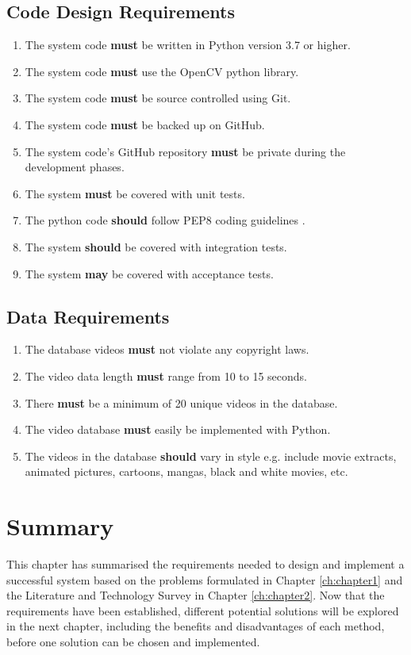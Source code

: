 \subsection{Code Design Requirements}

\begin{enumerate}
    \item The system code \textbf{must} be written in Python version 3.7 or higher.
    \item The system code \textbf{must} use the OpenCV python library.
    \item The system code \textbf{must} be source controlled using Git.
    \item The system code \textbf{must} be backed up on GitHub.
    \item The system code's GitHub repository \textbf{must} be private during the development phases.
    \item The system \textbf{must} be covered with unit tests.
    \item The python code \textbf{should} follow PEP8 coding guidelines \cite{pep8}.
    \item The system \textbf{should} be covered with integration tests.
    \item The system \textbf{may} be covered with acceptance tests.
\end{enumerate}

\subsection{Data Requirements}

\begin{enumerate}
    \item The database videos \textbf{must} not violate any copyright laws.
    \item The video data length \textbf{must} range from 10 to 15 seconds.
    \item There \textbf{must} be a minimum of 20 unique videos in the database.
    \item The video database \textbf{must} easily be implemented with Python.
    \item The videos in the database \textbf{should} vary in style e.g. include movie extracts, animated pictures, cartoons, mangas, black and white movies, etc.
    
\end{enumerate}

\section{Summary}

This chapter has summarised the requirements needed to design and implement a successful system based on the problems formulated in Chapter \ref{ch:chapter1} and the Literature and Technology Survey in Chapter \ref{ch:chapter2}. Now that the requirements have been established, different potential solutions will be explored in the next chapter, including the benefits and disadvantages of each method, before one solution can be chosen and implemented.